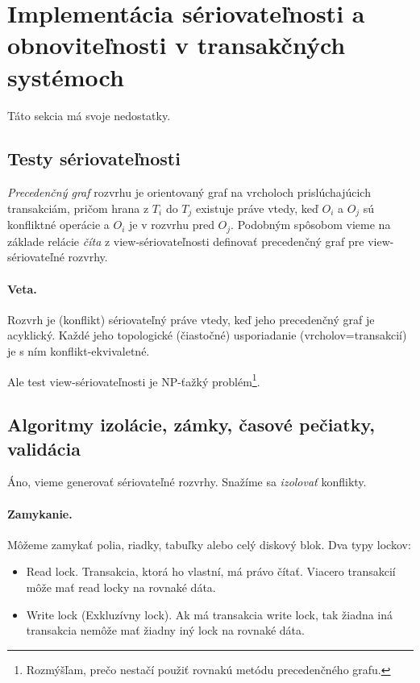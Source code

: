 \documentclass[10pt,a4paper]{article}
\begin{document}
\section{Implementácia sériovateľnosti a obnoviteľnosti v transakčných systémoch} 
Táto sekcia má svoje nedostatky.

\subsection{Testy sériovateľnosti}
\label{test_seriovatelnosti}

\emph{Precedenčný graf} rozvrhu je orientovaný graf na vrcholoch prislúchajúcich transakciám,
pričom hrana z $T_i$ do $T_j$ existuje práve vtedy, keď $O_i$ a $O_j$ sú konfliktné operácie a $O_i$ je v rozvrhu pred $O_j$.  
Podobným spôsobom vieme na základe relácie \emph{číta} z view-sériovateľnosti definovať precedenčný graf pre view-sériovateľné rozvrhy. 

\paragraph{Veta.} Rozvrh je (konflikt) sériovateľný práve vtedy, keď jeho precedenčný graf je acyklický. Každé jeho topologické (čiastočné) usporiadanie (vrcholov=transakcií) je s ním konflikt-ekvivaletné.  

Ale test view-sériovateľnosti je NP-ťažký problém\footnote{
Rozmýšľam, prečo nestačí použiť rovnakú metódu precedenčného grafu. 
}. 


\subsection{Algoritmy izolácie, zámky, časové pečiatky, validácia}

Áno, vieme generovať sériovateľné rozvrhy. Snažíme sa \emph{izolovať} konflikty. 

\paragraph{Zamykanie.}
Môžeme zamykať polia, riadky, tabuľky alebo celý diskový blok. Dva typy lockov: 
\begin{itemize}
\item Read lock. Transakcia, ktorá ho vlastní, má právo čítať. Viacero transakcií môže mať read locky na rovnaké dáta. 
\item Write lock (Exkluzívny lock). Ak má transakcia write lock, tak žiadna iná transakcia nemôže mať žiadny iný lock na rovnaké dáta. 
\end{itemize}
\end{document}
